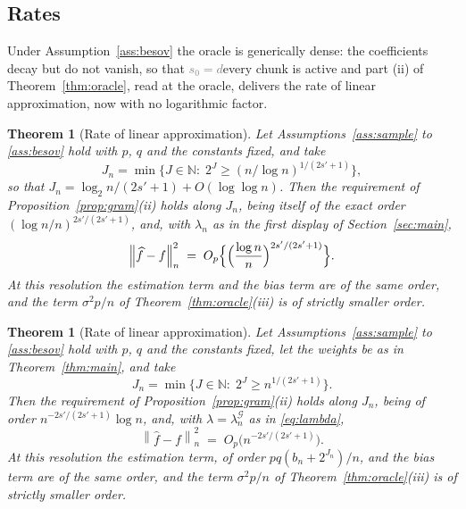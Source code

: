 \documentclass[12pt]{article} %
\newtheorem{theorem}{Theorem}
\theoremstyle{definition}
\theoremstyle{plain}
\newtheorem*{theoremold}{Theorem}
\newcommand{\normn}[1]{\left\lVert #1 \right\rVert_{n}}
\newcommand{\pen}{\lambda}
\newcommand{\penn}{\lambda_{n}}
\newcommand{\seff}{s'}
\newcommand{\bn}{b_{n}}
\newcommand{\lamG}{\lambda^{\mathcal{G}}_{n}}
\newcommand{\removedk}{\par\noindent[removed in k = 4]\par}
\begin{document}
\subsection{Rates}
\label{sec:rates}

Under Assumption~\ref{ass:besov} the \textcolor{colR1}{oracle} is generically dense: the
coefficients decay but do not vanish, so that \textcolor{gray}{\sout{$s_0 = d$}}\textcolor{colR1}{every chunk is
active} and part (ii) of
Theorem~\ref{thm:oracle}, read at the oracle, delivers the rate of
\textcolor{colR1}{linear approximation}\textcolor{colR1}{, now with no logarithmic factor}.

{\color{gray}\removedk
\begin{theoremold}[Rate of linear approximation]
Let Assumptions~\ref{ass:sample} to \ref{ass:besov} hold with $p$, $q$ and the
constants fixed, and take
\[
  J_n = \min\bigl\{J \in \mathbb{N} :\;
  2^{J} \ge (n/\log n)^{1/(2\seff+1)}\bigr\},
\]
so that $J_n = \log_2 n/(2\seff+1) + O(\log\log n)$. Then the requirement of
Proposition~\ref{prop:gram}(ii) holds along $J_n$, being itself of the exact
order $(\log n/n)^{2\seff/(2\seff+1)}$, and, with $\penn$ as in
the first display of Section~\ref{sec:main},
\[
  \normn{\widehat{f}-f}^{2}
  \;=\; O_p\Bigl\{\Bigl(\frac{\log n}{n}\Bigr)^{2\seff/(2\seff+1)}\Bigr\} .
\]
At this resolution the estimation term and the bias term are of the same
order, and the term $\sigma^{2}p/n$ of Theorem~\ref{thm:oracle}(iii) is of
strictly smaller order.
\end{theoremold}
}
{\color{colR1}
\begin{theorem}[Rate of linear approximation]
\label{thm:sieve}
Let Assumptions~\ref{ass:sample} to \ref{ass:besov} hold with $p$, $q$ and the
constants fixed, let the weights be as in Theorem~\ref{thm:main}, and take
\begin{equation}
  \label{eq:Jn}
  J_n = \min\bigl\{J \in \mathbb{N} :\;
  2^{J} \ge n^{1/(2\seff+1)}\bigr\}.
\end{equation}
Then the requirement of Proposition~\ref{prop:gram}(ii) holds along $J_n$,
being of order $n^{-2\seff/(2\seff+1)}\log n$, and, with $\pen = \lamG$ as in
\eqref{eq:lambda},
\[
  \normn{\widehat{f}-f}^{2}
  \;=\; O_p\bigl(n^{-2\seff/(2\seff+1)}\bigr) .
\]
At this resolution the estimation term, of order $pq(\bn + 2^{J_n})/n$, and
the bias term are of the same order, and the term $\sigma^{2}p/n$ of
Theorem~\ref{thm:oracle}(iii) is of strictly smaller order.
\end{theorem}
}
\end{document}
